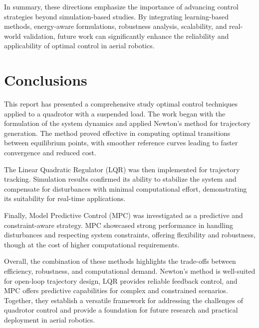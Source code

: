 \documentclass[a4paper,11pt,oneside]{book}
\begin{document}
In summary, these directions emphasize the importance of advancing control strategies beyond simulation-based studies. By integrating learning-based methods, energy-aware formulations, robustness analysis, scalability, and real-world validation, future work can significantly enhance the reliability and applicability of optimal control in aerial robotics.  



\chapter*{Conclusions}

This report has presented a comprehensive study optimal control techniques applied to a quadrotor with a suspended load. The work began with the formulation of the system dynamics and applied Newton’s method for trajectory generation. The method proved effective in computing optimal transitions between equilibrium points, with smoother reference curves leading to faster convergence and reduced cost.

The Linear Quadratic Regulator (LQR) was then implemented for trajectory tracking. Simulation results confirmed its ability to stabilize the system and compensate for disturbances with minimal computational effort, demonstrating its suitability for real-time applications.

Finally, Model Predictive Control (MPC) was investigated as a predictive and constraint-aware strategy. MPC showcased strong performance in handling disturbances and respecting system constraints, offering flexibility and robustness, though at the cost of higher computational requirements.

Overall, the combination of these methods highlights the trade-offs between efficiency, robustness, and computational demand. Newton’s method is well-suited for open-loop trajectory design, LQR provides reliable feedback control, and MPC offers predictive capabilities for complex and constrained scenarios. Together, they establish a versatile framework for addressing the challenges of quadrotor control and provide a foundation for future research and practical deployment in aerial robotics.




\nocite{*}
{}


\end{document}
